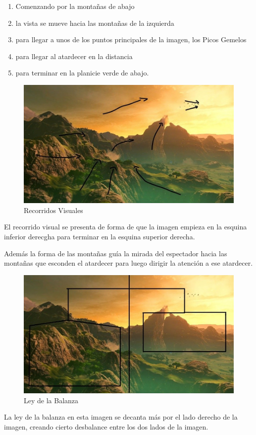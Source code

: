 \documentclass[12pt]{article}
\begin{document}
          \begin{enumerate}
            \item Comenzando por la montañas de abajo 
            \item la vista se mueve hacia las montañas de la izquierda
            \item para llegar a unos de los puntos principales de la imagen, los Picos Gemelos
            \item para llegar al atardecer en la distancia
            \item para terminar en la planicie verde de abajo.
          \end{enumerate}

          \begin{figure}[H]
            \centering
            \includegraphics[scale = 0.5]{Jesus/Seccion16/Fondo2.JPEG}
            \caption{Recorridos Visuales}
          \end{figure}
	          El recorrido visual se presenta de forma de que la imagen empieza en la esquina inferior derecgha para terminar en la esquina superior derecha.

            Además la forma de las montañas guía la mirada del espectador hacia las montañas que esconden el atardecer para luego dirigir la atención a ese atardecer. 
          
          \begin{figure}[H]
            \centering
            \includegraphics[scale = 0.5]{Jesus/Seccion16/Fondo6.JPEG}
            \caption{Ley de la Balanza}
          \end{figure}
            La ley de la balanza en esta imagen se decanta más por el lado derecho de la imagen, creando cierto desbalance entre los dos lados de la imagen. 
            
\end{document}
